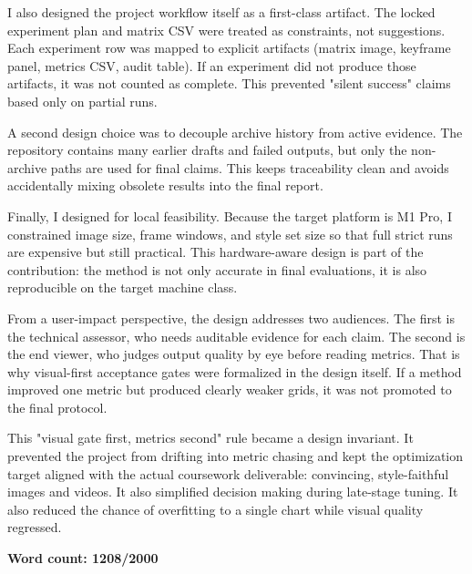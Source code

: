 \documentclass[12pt,letterpaper]{article}
\begin{document}
I also designed the project workflow itself as a first-class artifact. The locked experiment plan and matrix CSV were treated as constraints, not suggestions. Each experiment row was mapped to explicit artifacts (matrix image, keyframe panel, metrics CSV, audit table). If an experiment did not produce those artifacts, it was not counted as complete. This prevented "silent success" claims based only on partial runs.

A second design choice was to decouple archive history from active evidence. The repository contains many earlier drafts and failed outputs, but only the non-archive paths are used for final claims. This keeps traceability clean and avoids accidentally mixing obsolete results into the final report.

Finally, I designed for local feasibility. Because the target platform is M1 Pro, I constrained image size, frame windows, and style set size so that full strict runs are expensive but still practical. This hardware-aware design is part of the contribution: the method is not only accurate in final evaluations, it is also reproducible on the target machine class.

From a user-impact perspective, the design addresses two audiences. The first is the technical assessor, who needs auditable evidence for each claim. The second is the end viewer, who judges output quality by eye before reading metrics. That is why visual-first acceptance gates were formalized in the design itself. If a method improved one metric but produced clearly weaker grids, it was not promoted to the final protocol.

This "visual gate first, metrics second" rule became a design invariant. It prevented the project from drifting into metric chasing and kept the optimization target aligned with the actual coursework deliverable: convincing, style-faithful images and videos. It also simplified decision making during late-stage tuning. It also reduced the chance of overfitting to a single chart while visual quality regressed.

\textbf{Word count: 1208/2000}


\begin{table}[htbp]
\centering
\footnotesize
\setlength{\tabcolsep}{4pt}
\caption{Dataset sources used in this report.}
\label{tab:dataset-sources}
\end{table}
\end{document}
